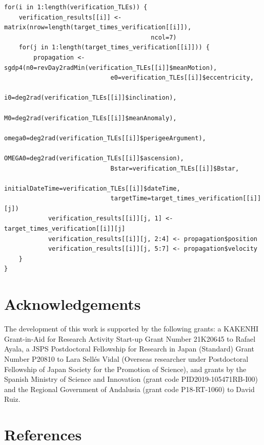 \begin{verbatim}
for(i in 1:length(verification_TLEs)) {
    verification_results[[i]] <- matrix(nrow=length(target_times_verification[[i]]),
                                        ncol=7)
    for(j in 1:length(target_times_verification[[i]])) {
        propagation <- sgdp4(n0=revDay2radMin(verification_TLEs[[i]]$meanMotion),
                             e0=verification_TLEs[[i]]$eccentricity,
                             i0=deg2rad(verification_TLEs[[i]]$inclination),
                             M0=deg2rad(verification_TLEs[[i]]$meanAnomaly),
                             omega0=deg2rad(verification_TLEs[[i]]$perigeeArgument),
                             OMEGA0=deg2rad(verification_TLEs[[i]]$ascension),
                             Bstar=verification_TLEs[[i]]$Bstar,
                             initialDateTime=verification_TLEs[[i]]$dateTime, 
                             targetTime=target_times_verification[[i]][j])
            verification_results[[i]][j, 1] <- target_times_verification[[i]][j]
            verification_results[[i]][j, 2:4] <- propagation$position
            verification_results[[i]][j, 5:7] <- propagation$velocity
    }
}
\end{verbatim}

\hypertarget{acknowledgements}{%
\section{Acknowledgements}\label{acknowledgements}}

The development of this work is supported by the following grants: a KAKENHI Grant-in-Aid for Research Activity Start-up Grant Number 21K20645 to Rafael Ayala, a JSPS Postdoctoral Fellowship for Research in Japan (Standard) Grant Number P20810 to Lara Sellés Vidal (Overseas researcher under Postdoctoral Fellowship of Japan Society for the Promotion of Science), and grants by the Spanish Ministry of Science and Innovation (grant code PID2019-105471RB-I00) and the Regional Government of Andalusia (grant code P18-RT-1060) to David Ruiz.

\hypertarget{references}{%
\section*{References}\label{references}}

